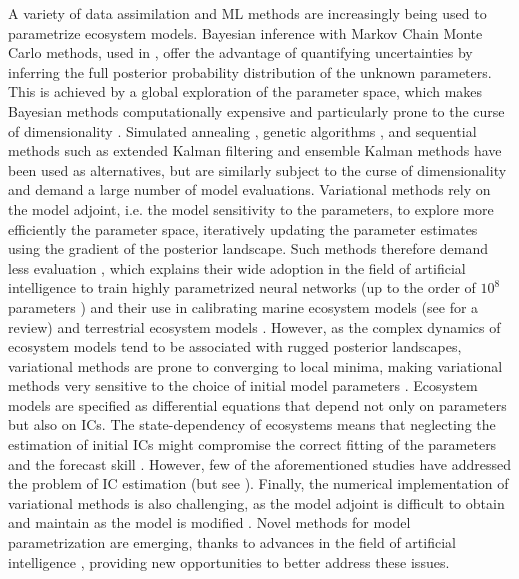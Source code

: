 A variety of data assimilation and ML methods are increasingly being used to parametrize ecosystem models.
%
Bayesian inference with Markov Chain Monte Carlo methods, used in \citep{Lignell2013,Higgins2010,Xu2006,Fiechter2013,Rosenbaum2019}, offer the advantage of quantifying uncertainties by inferring the full posterior probability distribution of the unknown parameters. This is achieved by a global exploration of the parameter space, which makes Bayesian methods computationally expensive and particularly prone to the curse of dimensionality \citep{Gosh2021}.
%
Simulated annealing \citep{Matear1995}, genetic algorithms \citep{Ward2010}, and sequential methods such as extended Kalman filtering and ensemble Kalman methods \citep{Bertino2003,Doron2013,Gharamti2017} have been used as alternatives, but are similarly subject to the curse of dimensionality and demand a large number of model evaluations.
%
Variational methods rely on the model adjoint, i.e. the model sensitivity to the parameters, to explore more efficiently the parameter space, iteratively updating the parameter estimates using the gradient of the posterior landscape. Such methods therefore demand less evaluation \citep{Schartau2017}, which explains their wide adoption in the field of artificial intelligence to train highly parametrized neural networks (up to the order of $10^8$ parameters \citep{NIPS2017_3f5ee243}) and their use in calibrating marine ecosystem models \citep{Fennel2001,Spitz1998,Xiao2014,Pelc2012} (see \citep{Schartau2017} for a review) and terrestrial ecosystem models \citep{Zhu2015,DeLong2014,Curtsdotter2019}. 
%
However, as the complex dynamics of ecosystem models tend to be associated with rugged posterior landscapes, variational methods are prone to converging to local minima, making variational methods very sensitive to the choice of initial model parameters \citep{Gabor2015,Schartau2017}.
%
Ecosystem models are specified as differential equations that depend not only on parameters but also on ICs. The state-dependency of ecosystems means that neglecting the estimation of initial ICs might compromise the correct fitting of the parameters and the forecast skill \citep{Lignell2013}. However, few of the aforementioned studies have addressed the problem of IC estimation (but see \citep{Pelc2012}). 
%
Finally, the numerical implementation of variational methods is also challenging, as the model adjoint is difficult to obtain and maintain as the model is modified \citep{Lawson1995,Pelc2012,Gharamti2017}. 
%
Novel methods for model parametrization are emerging, thanks to advances in the field of artificial intelligence \citep{Willard2020,Kashinath2021,Alber2019,Peng2021}, providing new opportunities to better address these issues.
    
